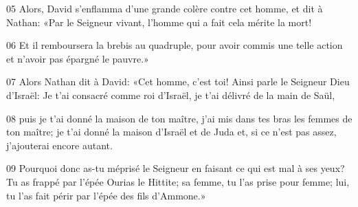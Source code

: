 
05 Alors, David s’enflamma d’une grande colère contre cet homme, et dit à Nathan: «Par le Seigneur vivant, l’homme qui a fait cela mérite la mort!

06 Et il remboursera la brebis au quadruple, pour avoir commis une telle action et n’avoir pas épargné le pauvre.»

07 Alors Nathan dit à David: «Cet homme, c’est toi! Ainsi parle le Seigneur Dieu d’Israël: Je t’ai consacré comme roi d’Israël, je t’ai délivré de la main de Saül,

08 puis je t’ai donné la maison de ton maître, j’ai mis dans tes bras les femmes de ton maître; je t’ai donné la maison d’Israël et de Juda et, si ce n’est pas assez, j’ajouterai encore autant.

09 Pourquoi donc as-tu méprisé le Seigneur en faisant ce qui est mal à ses yeux? Tu as frappé par l’épée Ourias le Hittite; sa femme, tu l’as prise pour femme; lui, tu l’as fait périr par l’épée des fils d’Ammone.»
